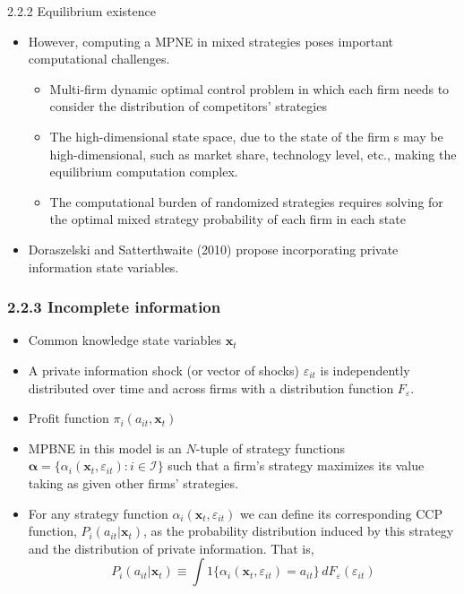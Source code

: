 \documentclass[aspectratio=169]{beamer}  %
\begin{document}
\begin{frame}
{2.2.2 Equilibrium existence}
\begin{itemize}
     \item However, computing a MPNE in mixed strategies poses important computational challenges.
    \begin{itemize}
        \item Multi-firm dynamic optimal control problem in which each firm needs to consider the distribution of competitors' strategies 
        \item The high-dimensional state space, due to the state of the firm s may be high-dimensional, such as market share, technology level, etc., making the equilibrium computation complex.
        \item The computational burden of randomized strategies requires solving for the optimal mixed strategy probability of each firm in each state 
    \end{itemize}
    \item Doraszelski and Satterthwaite (2010) propose incorporating private information state variables.
\end{itemize}
\end{frame}


\begin{frame}
\frametitle{2.2.3 Incomplete information}
    \begin{itemize}
        \item Common knowledge state variables $\mathbf{x}_t$
        \item A private information shock (or vector of shocks) $\varepsilon_{it}$ is independently distributed over time and across firms with a distribution function $F_{\varepsilon}$.
        \item Profit function $\pi_i(a_{it}, \mathbf{x}_t)$
        \item MPBNE in this model is an \(N\)-tuple of strategy functions \(\boldsymbol{\alpha} = \{\alpha_i(\mathbf{x}_t, \varepsilon_{it}) : i \in \mathcal{I}\}\) such that a firm's strategy maximizes its value taking as given other firms' strategies.
        \item For any strategy function $\alpha_i(\mathbf{x}_t, \varepsilon_{it})$ we can define its corresponding CCP function, $P_i(a_{it}|\mathbf{x}_t)$, as the probability distribution induced by this strategy and the distribution of private information. That is,
        \begin{equation}\label{}
            P_i(a_{it}|\mathbf{x}_t) \equiv \int 1\{\alpha_i(\mathbf{x}_t, \varepsilon_{it}) = a_{it}\} \, dF_{\varepsilon}(\varepsilon_{it})
        \end{equation}
    \end{itemize}
\end{frame}
\end{document}
